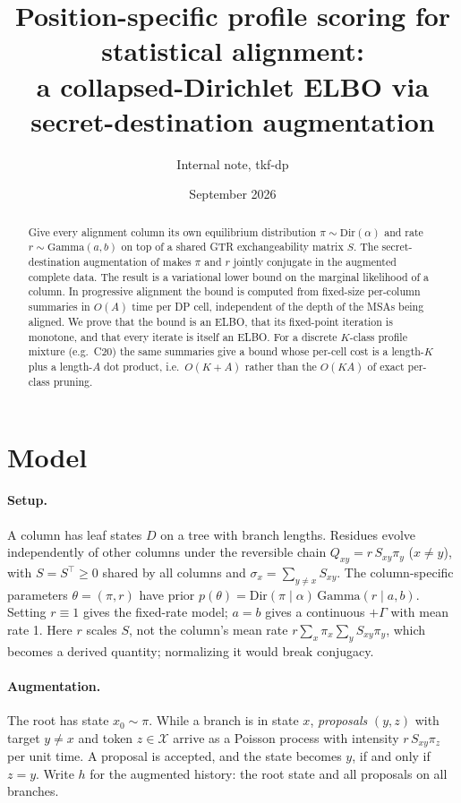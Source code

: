 \documentclass[11pt]{article}
\title{Position-specific profile scoring for statistical alignment:\\
a collapsed-Dirichlet ELBO via secret-destination augmentation}
\author{Internal note, tkf-dp}
\date{September 2026}
\newcommand{\Xset}{\mathcal X}
\newcommand{\Dir}{\mathrm{Dir}}
\newcommand{\Gam}{\mathrm{Gamma}}
\begin{document}
\maketitle

\begin{abstract}
Give every alignment column its own equilibrium distribution
$\pi\sim\Dir(\alpha)$ and rate $r\sim\Gam(a,b)$ on top of a shared GTR
exchangeability matrix $S$. The secret-destination augmentation of
\citet{Bruno1996} makes $\pi$ and $r$ jointly conjugate in the augmented
complete data. The result is a variational lower bound on the marginal
likelihood of a column. In progressive alignment the bound is computed from
fixed-size per-column summaries in $O(A)$ time per DP cell, independent of the
depth of the MSAs being aligned. We prove that the bound is an ELBO, that its
fixed-point iteration is monotone, and that every iterate is itself an ELBO. For a
discrete $K$-class profile mixture (e.g.\ C20) the same summaries give a bound
whose per-cell cost is a length-$K$ plus a length-$A$ dot product, i.e.\
$O(K+A)$ rather than the $O(KA)$ of exact per-class pruning.
\end{abstract}

\section{Model}

\paragraph{Setup.} A column has leaf states $D$ on a tree with branch lengths.
Residues evolve independently of other columns under the reversible chain
$Q_{xy}=r\,S_{xy}\pi_y$ ($x\ne y$), with $S=S^\top\ge0$ shared by all columns and
$\sigma_x=\sum_{y\ne x}S_{xy}$. The column-specific parameters
$\theta=(\pi,r)$ have prior $p(\theta)=\Dir(\pi\mid\alpha)\,\Gam(r\mid a,b)$.
Setting $r\equiv1$ gives the fixed-rate model; $a=b$ gives a continuous $+\Gamma$
with mean rate 1. Here $r$ scales $S$, not the column's mean rate
$r\sum_x\pi_x\sum_y S_{xy}\pi_y$, which becomes a derived quantity; normalizing
it would break conjugacy.

\paragraph{Augmentation.} The root has state $x_0\sim\pi$. While a branch is in
state $x$, \emph{proposals} $(y,z)$ with target $y\ne x$ and token $z\in\Xset$
arrive as a Poisson process with intensity $r\,S_{xy}\pi_z$ per unit time. A
proposal is accepted, and the state becomes $y$, if and only if $z=y$. Write
$h$ for the augmented history: the root state and all proposals on all
branches.
\end{document}
